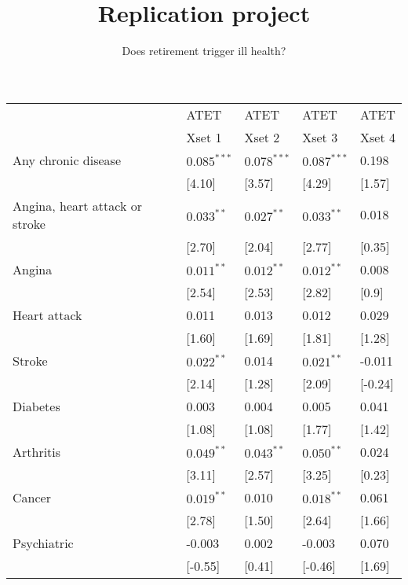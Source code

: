 \documentclass[12pt]{article}
\title{\vspace{-8ex} Replication project \vspace{-2ex}}
\author{Does retirement trigger ill health?}
\date{\vspace{-4ex}}
\begin{document}
\maketitle

\begin{tabular}{lllll}
    \toprule
     & ATET & ATET & ATET & ATET \\
     & Xset 1 & Xset 2 & Xset 3 & Xset 4 \\
    \midrule
    Any chronic disease & $0.085^{***}$ & $0.078^{***}$ & $0.087^{***}$ & 0.198 \\
    & [4.10] & [3.57] & [4.29] & [1.57] \\
   Angina, heart attack or stroke & $0.033^{**}$ & $0.027^{**}$ & $0.033^{**}$ & 0.018 \\
    & [2.70] & [2.04] & [2.77] & [0.35] \\
   Angina & $0.011^{**}$ & $0.012^{**}$ & $0.012^{**}$ & 0.008 \\
    & [2.54] & [2.53] & [2.82] & [0.9] \\
   Heart attack & 0.011 & 0.013 & 0.012 & 0.029 \\
    & [1.60] & [1.69] & [1.81] & [1.28] \\
   Stroke & $0.022^{**}$ & 0.014 & $0.021^{**}$ & -0.011 \\
    & [2.14] & [1.28] & [2.09] & [-0.24] \\
   Diabetes & 0.003 & 0.004 & 0.005 & 0.041 \\
    & [1.08] & [1.08] & [1.77] & [1.42] \\
   Arthritis & $0.049^{**}$ & $0.043^{**}$ & $0.050^{**}$ & 0.024 \\
    & [3.11] & [2.57] & [3.25] & [0.23] \\
   Cancer & $0.019^{**}$ & 0.010 & $0.018^{**}$ & 0.061 \\
    & [2.78] & [1.50] & [2.64] & [1.66] \\
   Psychiatric & -0.003 & 0.002 & -0.003 & 0.070 \\
    & [-0.55] & [0.41] & [-0.46] & [1.69] \\
    \bottomrule
    \end{tabular}
\end{document}
